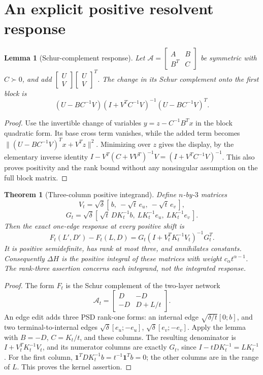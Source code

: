 \documentclass[11pt]{article}
\newtheorem{theorem}{Theorem}
\newtheorem{lemma}{Lemma}
\begin{document}
\section{An explicit positive resolvent response}
\begin{lemma}[Schur-complement response]
Let $\mathcal A=\left[\begin{smallmatrix} A&B\\B^T&C\end{smallmatrix}\right]$
be symmetric with $C\succ0$, and add
$\left[\begin{smallmatrix} U\\V\end{smallmatrix}\right]
\left[\begin{smallmatrix} U\\V\end{smallmatrix}\right]^T$.
The change in its Schur complement onto the first block is
\[
 (U-BC^{-1}V)(I+V^TC^{-1}V)^{-1}(U-BC^{-1}V)^T.
\]
\end{lemma}
\begin{proof}
Use the invertible change of variables
$y=z-C^{-1}B^Tx$ in the block quadratic form. Its base cross term
vanishes, while the added term becomes
$\|(U-BC^{-1}V)^Tx+V^Tz\|^2$. Minimizing over $z$ gives the display,
by the elementary inverse identity
$I-V^T(C+VV^T)^{-1}V=(I+V^TC^{-1}V)^{-1}$.
This also proves positivity and the rank bound without any nonsingular
assumption on the full block matrix.
\end{proof}

\begin{theorem}[Three-column positive integrand]\label{thm:three}
Define $n$-by-$3$ matrices
\[
 V_t=\sqrt\delta[\,b,\ -\sqrt t\,e_u,\ -\sqrt t\,e_v\,],
\]
\[
 G_t=\sqrt\delta[\,\sqrt t\,D K_t^{-1}b,\
                    LK_t^{-1}e_u,\ LK_t^{-1}e_v\,].
\]
Then the exact one-edge response at every positive shift is
\begin{equation}\label{eq:factor}
 F_t(L',D')-F_t(L,D)
   =G_t(I+V_t^TK_t^{-1}V_t)^{-1}G_t^T.
\end{equation}
It is positive semidefinite, has rank at most three, and annihilates
constants. Consequently $\Delta H$ is the positive integral of these
matrices with weight $c_\alpha t^{\alpha-1}$.
The rank-three assertion concerns each integrand, not the integrated
response.
\end{theorem}
\begin{proof}
The form $F_t$ is the Schur complement of the two-layer network
\[
 \mathcal A_t=\begin{bmatrix}D&-D\\-D&D+L/t\end{bmatrix}.
\]
An edge edit adds three PSD rank-one forms: an internal edge
$\sqrt{\delta/t}[0;b]$, and two terminal-to-internal edges
$\sqrt\delta[e_u;-e_u]$, $\sqrt\delta[e_v;-e_v]$.
Apply the lemma with $B=-D$, $C=K_t/t$, and these columns.
The resulting denominator is $I+V_t^TK_t^{-1}V_t$, and its numerator
columns are exactly $G_t$, since $I-tDK_t^{-1}=LK_t^{-1}$.
For the first column,
$\mathbf1^TDK_t^{-1}b=t^{-1}\mathbf1^Tb=0$; the other columns
are in the range of $L$. This proves the kernel assertion.
\end{proof}
\end{document}
